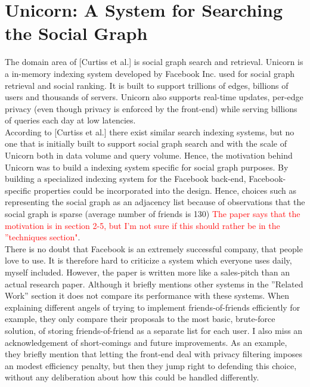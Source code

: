 \documentclass{article}
\begin{document}
\section{Unicorn: A System for Searching the Social Graph}

The domain area of [Curtiss et al.] is social graph search and retrieval. Unicorn is a in-memory indexing system developed by Facebook Inc. used for social graph retrieval and social ranking. It is built to support trillions of edges, billions of users and thousands of servers. Unicorn also supports real-time updates, per-edge privacy (even though privacy is enforced by the front-end) while serving billions of queries each day at low latencies.\\

\noindent According to [Curtiss et al.] there exist similar search indexing systems, but no one that is initially built to support social graph search and with the scale of Unicorn both in data volume and query volume. Hence, the motivation behind Unicorn was to build a indexing system specific for social graph purposes. By building a specialized indexing system for the Facebook back-end, Facebook-specific properties could be incorporated into the design. Hence, choices such as representing the social graph as an adjacency list because of observations that the social graph is sparse (average number of friends is 130) \textcolor{red}{The paper says that the motivation is in section 2-5, but I'm not sure if this should rather be in the ''techniques section"}.\\

\noindent There is no doubt that Facebook is an extremely successful company, that people love to use. It is therefore hard to criticize a system which everyone uses daily, myself included. However, the paper is written more like a sales-pitch than an actual research paper. Although it briefly mentions other systems in the ''Related Work'' section it does not compare its performance with these systems. When explaining different angels of trying to implement friends-of-friends efficiently for example, they only compare their proposals to the most basic, brute-force solution, of storing friends-of-friend as a separate list for each user. I also miss an acknowledgement of short-comings and future improvements. As an example, they briefly mention that letting the front-end deal with privacy filtering imposes an modest efficiency penalty, but then they jump right to defending this choice, without any deliberation about how this could be handled differently.

\end{document}
